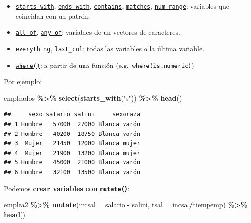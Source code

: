 \documentclass[
]{book}
\newenvironment{Shaded}{\begin{snugshade}}{\end{snugshade}}
\newcommand{\AttributeTok}[1]{\textcolor[rgb]{0.13,0.29,0.53}{#1}}
\newcommand{\FunctionTok}[1]{\textcolor[rgb]{0.13,0.29,0.53}{\textbf{#1}}}
\newcommand{\NormalTok}[1]{#1}
\newcommand{\SpecialCharTok}[1]{\textcolor[rgb]{0.81,0.36,0.00}{\textbf{#1}}}
\newcommand{\StringTok}[1]{\textcolor[rgb]{0.31,0.60,0.02}{#1}}
\theoremstyle{break}
\theoremstyle{nonumberplain}
\begin{document}
\begin{itemize}
\item
  \href{https://tidyselect.r-lib.org/reference/starts_with.html}{\texttt{starts\_with}}, \href{https://tidyselect.r-lib.org/reference/starts_with.html}{\texttt{ends\_with}}, \href{https://tidyselect.r-lib.org/reference/starts_with.html}{\texttt{contains}}, \href{https://tidyselect.r-lib.org/reference/starts_with.html}{\texttt{matches}}, \href{https://tidyselect.r-lib.org/reference/starts_with.html}{\texttt{num\_range}}: variables que coincidan con un patrón.
\item
  \href{https://tidyselect.r-lib.org/reference/all_of.html}{\texttt{all\_of}}, \href{https://tidyselect.r-lib.org/reference/all_of.html}{\texttt{any\_of}}: variables de un vectores de caracteres.
\item
  \href{https://tidyselect.r-lib.org/reference/everything.html}{\texttt{everything}}, \href{https://tidyselect.r-lib.org/reference/everything.html}{\texttt{last\_col}}: todas las variables o la última variable.
\item
  \href{https://tidyselect.r-lib.org/reference/where.html}{\texttt{where()}}: a partir de una función (e.g.~\texttt{where(is.numeric)})
\end{itemize}

Por ejemplo:

\begin{Shaded}
\begin{Highlighting}[]
\NormalTok{empleados }\SpecialCharTok{\%\textgreater{}\%} \FunctionTok{select}\NormalTok{(}\FunctionTok{starts\_with}\NormalTok{(}\StringTok{"s"}\NormalTok{)) }\SpecialCharTok{\%\textgreater{}\%} \FunctionTok{head}\NormalTok{()}
\end{Highlighting}
\end{Shaded}

\begin{verbatim}
##     sexo salario salini     sexoraza
## 1 Hombre   57000  27000 Blanca varón
## 2 Hombre   40200  18750 Blanca varón
## 3  Mujer   21450  12000 Blanca mujer
## 4  Mujer   21900  13200 Blanca mujer
## 5 Hombre   45000  21000 Blanca varón
## 6 Hombre   32100  13500 Blanca varón
\end{verbatim}

Podemos \textbf{crear variables con \href{https://dplyr.tidyverse.org/reference/mutate.html}{\texttt{mutate()}}}:

\begin{Shaded}
\begin{Highlighting}[]
\NormalTok{emplea2 }\SpecialCharTok{\%\textgreater{}\%} 
  \FunctionTok{mutate}\NormalTok{(}\AttributeTok{incsal =}\NormalTok{ salario }\SpecialCharTok{{-}}\NormalTok{ salini, }\AttributeTok{tsal =}\NormalTok{ incsal}\SpecialCharTok{/}\NormalTok{tiempemp) }\SpecialCharTok{\%\textgreater{}\%} 
  \FunctionTok{head}\NormalTok{()}
\end{Highlighting}
\end{Shaded}
\end{document}
